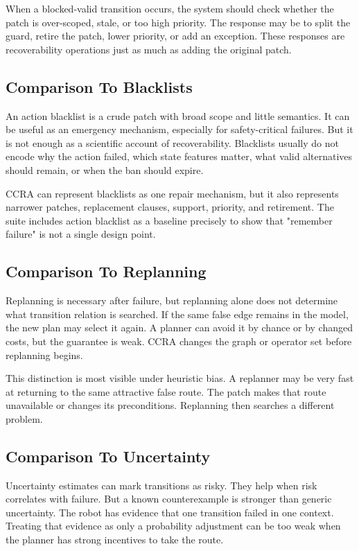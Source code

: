 \documentclass{article}
\newcommand{\ccra}{\textsc{CCRA}}
\begin{document}
When a blocked-valid transition occurs, the system should check whether the
patch is over-scoped, stale, or too high priority. The response may be to split
the guard, retire the patch, lower priority, or add an exception. These
responses are recoverability operations just as much as adding the original
patch.

\subsection{Comparison To Blacklists}

An action blacklist is a crude patch with broad scope and little semantics. It
can be useful as an emergency mechanism, especially for safety-critical
failures. But it is not enough as a scientific account of recoverability.
Blacklists usually do not encode why the action failed, which state features
matter, what valid alternatives should remain, or when the ban should expire.

\ccra{} can represent blacklists as one repair mechanism, but it also
represents narrower patches, replacement clauses, support, priority, and
retirement. The suite includes action blacklist as a baseline precisely to show
that "remember failure" is not a single design point.

\subsection{Comparison To Replanning}

Replanning is necessary after failure, but replanning alone does not determine
what transition relation is searched. If the same false edge remains in the
model, the new plan may select it again. A planner can avoid it by chance or by
changed costs, but the guarantee is weak. \ccra{} changes the graph or operator
set before replanning begins.

This distinction is most visible under heuristic bias. A replanner may be very
fast at returning to the same attractive false route. The patch makes that
route unavailable or changes its preconditions. Replanning then searches a
different problem.

\subsection{Comparison To Uncertainty}

Uncertainty estimates can mark transitions as risky. They help when risk
correlates with failure. But a known counterexample is stronger than generic
uncertainty. The robot has evidence that one transition failed in one context.
Treating that evidence as only a probability adjustment can be too weak when
the planner has strong incentives to take the route.
\end{document}
